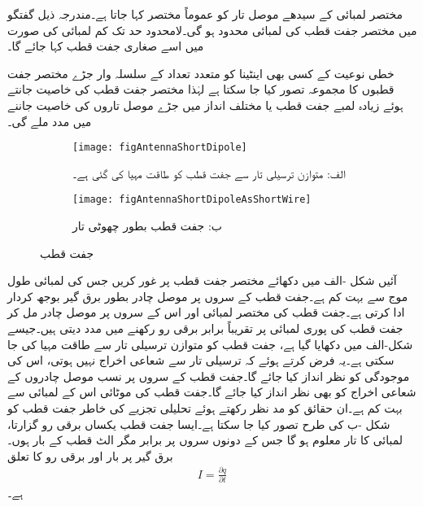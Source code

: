 
مختصر لمبائی کے سیدھے موصل تار کو عموماً مختصر  کہا جاتا ہے۔مندرجہ ذیل گفتگو میں مختصر جفت قطب کی لمبائی محدود ہو گی۔لامحدود حد تک کم لمبائی کی صورت میں اسے صغاری جفت قطب کہا جائے گا۔

خطی نوعیت کے کسی بھی اینٹینا کو متعدد تعداد کے سلسلہ وار جڑے مختصر جفت قطبوں کا مجموعہ تصور کیا جا سکتا ہے لہٰذا مختصر جفت قطب کی خاصیت جانتے ہوئے زیادہ لمبے جفت قطب یا مختلف انداز میں جڑے موصل  تاروں کی خاصیت جاننے میں مدد ملے گی۔ 

\begin{figure}
\centering
\begin{subfigure}{0.5\textwidth}
\centering
\texttt{[image: figAntennaShortDipole]}
\caption*{الف: متوازن ترسیلی تار سے جفت قطب کو طاقت مہیا کی گئی ہے۔}
\end{subfigure}%
%
\begin{subfigure}{0.5\textwidth}
\centering
\texttt{[image: figAntennaShortDipoleAsShortWire]}
\caption*{ب: جفت قطب بطور چھوٹی تار}
\end{subfigure}%
\caption{جفت قطب}
\label{شکل_اینٹینا_جفت_قطب}
\end{figure}



آئیں شکل -الف میں دکھائے مختصر جفت قطب پر غور کریں جس کی لمبائی  طول موج سے بہت کم  ہے۔جفت قطب کے سروں پر موصل چادر بطور  برق گیر   بوجھ کردار ادا کرتی ہے۔جفت قطب کی مختصر لمبائی اور اس کے سروں پر موصل چادر مل کر جفت قطب  کی پوری لمبائی پر تقریباً برابر برقی رو رکھنے میں مدد دیتی ہیں۔جیسے شکل-الف میں دکھایا گیا ہے، جفت قطب کو متوازن ترسیلی تار سے طاقت مہیا کی جا سکتی ہے۔یہ فرض کرتے ہوئے کہ ترسیلی تار سے شعاعی اخراج نہیں ہوتی، اس کی موجودگی کو نظر انداز کیا جائے گا۔جفت قطب کے سروں پر نسب موصل چادروں کے شعاعی اخراج کو بھی نظر انداز کیا جائے گا۔جفت قطب کی موٹائی  اس کے لمبائی سے بہت کم  ہے۔ان حقائق کو مد نظر رکھتے ہوئے تحلیلی تجزیے کی خاطر جفت قطب کو شکل -ب کی طرح تصور کیا جا سکتا ہے۔ایسا جفت قطب یکساں برقی رو  گزارتا،  لمبائی کا تار معلوم ہو گا جس کے دونوں سروں پر برابر مگر الٹ قطب کے بار  ہوں۔برق گیر  پر بار  اور برقی رو  کا تعلق
\begin{align}\label{مساوات_اینٹینا_رو_اور_بار}
I=\frac{\partial q}{\partial t}
\end{align}
ہے۔ 

